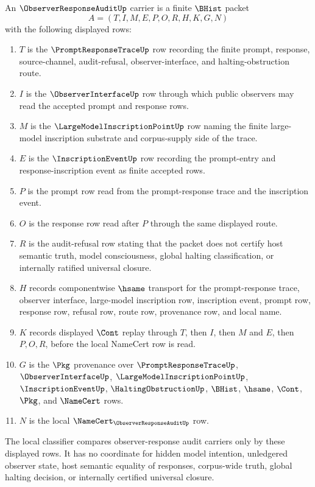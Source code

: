 \begin{definition}
\label{def:observer-response-audit-carrier}
An $\ObserverResponseAuditUp$ carrier is a finite $\BHist$ packet
$$
A=(T,I,M,E,P,O,R,H,K,G,N)
$$
with the following displayed rows:
\begin{enumerate}
\item $T$ is the $\PromptResponseTraceUp$ row recording the finite prompt, response, source-channel, audit-refusal, observer-interface, and halting-obstruction route.
\item $I$ is the $\ObserverInterfaceUp$ row through which public observers may read the accepted prompt and response rows.
\item $M$ is the $\LargeModelInscriptionPointUp$ row naming the finite large-model inscription substrate and corpus-supply side of the trace.
\item $E$ is the $\InscriptionEventUp$ row recording the prompt-entry and response-inscription event as finite accepted rows.
\item $P$ is the prompt row read from the prompt-response trace and the inscription event.
\item $O$ is the response row read after $P$ through the same displayed route.
\item $R$ is the audit-refusal row stating that the packet does not certify host semantic truth, model consciousness, global halting classification, or internally ratified universal closure.
\item $H$ records componentwise $\hsame$ transport for the prompt-response trace, observer interface, large-model inscription row, inscription event, prompt row, response row, refusal row, route row, provenance row, and local name.
\item $K$ records displayed $\Cont$ replay through $T$, then $I$, then $M$ and $E$, then $P,O,R$, before the local NameCert row is read.
\item $G$ is the $\Pkg$ provenance over $\PromptResponseTraceUp$, $\ObserverInterfaceUp$, $\LargeModelInscriptionPointUp$, $\InscriptionEventUp$, $\HaltingObstructionUp$, $\BHist$, $\hsame$, $\Cont$, $\Pkg$, and $\NameCert$ rows.
\item $N$ is the local $\NameCert_{\ObserverResponseAuditUp}$ row.
\end{enumerate}
The local classifier compares observer-response audit carriers only by these displayed rows. It has no coordinate for hidden model intention, unledgered observer state, host semantic equality of responses, corpus-wide truth, global halting decision, or internally certified universal closure.
\end{definition}

